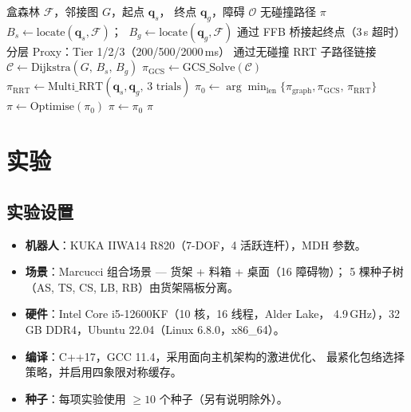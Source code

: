 \documentclass[journal]{IEEEtran}
\begin{document}
\begin{algorithm}[t]
\caption{在线查询流水线}\label{alg:query}
\footnotesize
\begin{algorithmic}[1]
\REQUIRE 盒森林 $\mathcal{F}$，邻接图 $G$，起点 $\bm{q}_s$，
  终点 $\bm{q}_g$，障碍 $\mathcal{O}$
\ENSURE 无碰撞路径 $\pi$
\STATE {}
\STATE $B_s \leftarrow \mathrm{locate}(\bm{q}_s, \mathcal{F})$；
  $\;B_g \leftarrow \mathrm{locate}(\bm{q}_g, \mathcal{F})$
  \hfill{}
  \STATE 通过 FFB 桥接起终点（3\,s 超时）
\ENDIF
\STATE {}
  \STATE 分层 Proxy：Tier 1/2/3（200/500/2000\,ms）
  \STATE 通过无碰撞 RRT 子路径链接
\ENDIF
\STATE {}
\STATE $\mathcal{C} \leftarrow \text{Dijkstra}(G,\, B_s,\, B_g)$
  \hfill{}
\STATE {}
  \STATE $\pi_{\text{GCS}} \leftarrow \text{GCS\_Solve}(\mathcal{C})$
\ENDIF
\STATE {}
\STATE $\pi_{\text{RRT}} \leftarrow
  \text{Multi\_RRT}(\bm{q}_s, \bm{q}_g,\, 3\text{ trials})$
\STATE $\pi_0 \leftarrow \arg\min_{\text{len}}\{\pi_{\text{graph}},
  \pi_{\text{GCS}},\, \pi_{\text{RRT}}\}$
\STATE {}
\STATE $\pi \leftarrow \text{Optimise}(\pi_0)$
  \hfill{}
  \STATE $\pi \leftarrow \pi_0$  \hfill{}
\ENDIF
\RETURN $\pi$
\end{algorithmic}
\end{algorithm}

\section{实验}\label{sec:experiments}

\subsection{实验设置}

\begin{itemize}[nosep]
  \item \textbf{机器人}：KUKA IIWA14 R820（7-DOF，4 活跃连杆），MDH 参数。
  \item \textbf{场景}：Marcucci 组合场景 --- 货架 + 料箱 + 桌面（16 障碍物）；
    5 棵种子树（AS, TS, CS, LB, RB）由货架隔板分离。
  \item \textbf{硬件}：Intel Core i5-12600KF（10 核，16 线程，Alder Lake，
    4.9\,GHz），32\,GB DDR4，Ubuntu 22.04（Linux 6.8.0，x86\_64）。
  \item \textbf{编译}：C++17，GCC 11.4，采用面向主机架构的激进优化、
    最紧化包络选择策略，并启用四象限对称缓存。
  \item \textbf{种子}：每项实验使用 $\geq 10$ 个种子（另有说明除外）。
\end{itemize}
\end{document}

